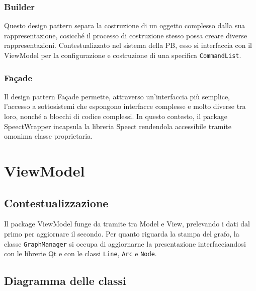 \documentclass[openany,12pt,a4paper]{report}
\begin{document}
\subsubsection{Builder}
Questo design pattern separa la costruzione di un oggetto complesso dalla sua rappresentazione, cosicché il processo di costruzione stesso possa creare diverse rappresentazioni. Contestualizzato nel sistema della PB, esso si interfaccia con il ViewModel per la configurazione e costruzione di una specifica \verb|CommandList|.

\subsubsection{Façade} 
Il design pattern Façade permette, attraverso un'interfaccia più semplice, l'accesso a sottosistemi che espongono interfacce complesse e molto diverse tra loro, nonché a blocchi di codice complessi. In questo contesto, il package SpeectWrapper incapsula la libreria Speect rendendola accessibile tramite omonima classe proprietaria.

\newpage

\section{ViewModel}

\subsection{Contestualizzazione}
Il package ViewModel funge da tramite tra Model e View, prelevando i dati dal primo per aggiornare il secondo. Per quanto riguarda la stampa del grafo, la classe \verb|GraphManager| si occupa di aggiornarne la presentazione interfacciandosi con le librerie Qt e con le classi \verb|Line|, \verb|Arc| e \verb|Node|.  

\subsection{Diagramma delle classi}
\end{document}
